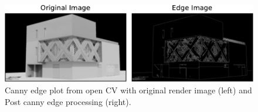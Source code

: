      \begin{figure}[htb]
          \centering
          \includegraphics[width= \linewidth]{Images/CannyEdgePlot}
          \caption{Canny edge plot from open CV with original render image (left) and Post canny edge processing (right).}
          \label{fig:CannyEdgePlot}
        \end{figure}

